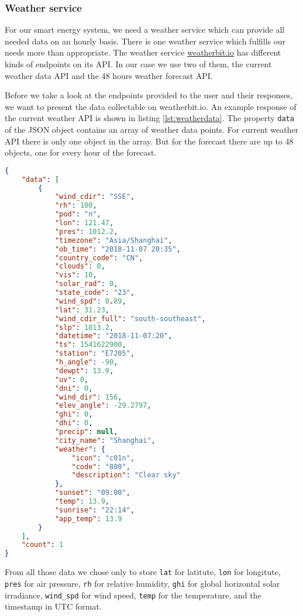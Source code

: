 \subsubsection{Weather service}\label{sec:weatherservice}
For our smart energy system, we need a weather service which can provide all needed data on an hourly basis.
There is one weather service which fulfills our needs more than appropriate.
The weather service \url{weatherbit.io} has different kinds of endpoints on its API.
In our case we use two of them, the current weather data API and the 48 hours weather forecast API.

Before we take a look at the endpoints provided to the user and their responses, we want to present the data collectable on weatherbit.io.
An example response of the current weather API is shown in listing \ref{lst:weatherdata}.
The property  \texttt{data} of the JSON object contains an array of weather data points.
For current weather API there is only one object in the array.
But for the forecast there are up to 48 objects, one for every hour of the forecast.
\begin{lstlisting}[caption={Example response of weatherbit.io for $lat=31.23$ and $lon=121.47$}, label={lst:weatherdata}, frame=single, language=json]
 {
    "data": [
        {
            "wind_cdir": "SSE",
            "rh": 100,
            "pod": "n",
            "lon": 121.47,
            "pres": 1012.2,
            "timezone": "Asia/Shanghai",
            "ob_time": "2018-11-07 20:35",
            "country_code": "CN",
            "clouds": 0,
            "vis": 10,
            "solar_rad": 0,
            "state_code": "23",
            "wind_spd": 0.89,
            "lat": 31.23,
            "wind_cdir_full": "south-southeast",
            "slp": 1013.2,
            "datetime": "2018-11-07:20",
            "ts": 1541622900,
            "station": "E7205",
            "h_angle": -90,
            "dewpt": 13.9,
            "uv": 0,
            "dni": 0,
            "wind_dir": 156,
            "elev_angle": -29.2797,
            "ghi": 0,
            "dhi": 0,
            "precip": null,
            "city_name": "Shanghai",
            "weather": {
                "icon": "c01n",
                "code": "800",
                "description": "Clear sky"
            },
            "sunset": "09:00",
            "temp": 13.9,
            "sunrise": "22:14",
            "app_temp": 13.9
        }
    ],
    "count": 1
}
\end{lstlisting}
From all those data we chose only to store \texttt{lat} for latitute, \texttt{lon} for longitute, \texttt{pres} for air pressure, \texttt{rh} for relative humidity, \texttt{ghi} for global horizontal solar irradiance, \texttt{wind\_spd} for wind speed, \texttt{temp} for the temperature, and the timestamp in UTC format.

